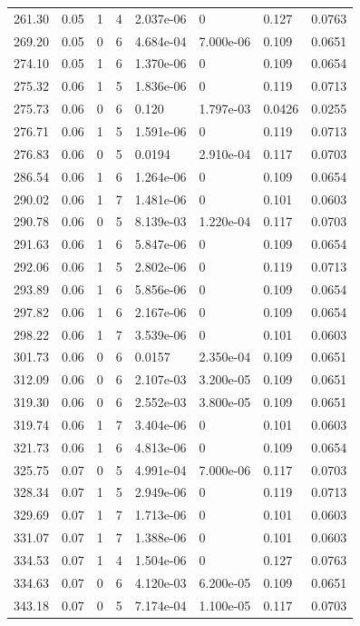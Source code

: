 \documentclass[preview]{standalone}
\begin{document}
{{{\begin{tabular}{L{1.2cm}C{1.2cm} C{0.3cm}C{0.5cm} C{1.4cm}C{1.4cm} C{1.4cm}C{1.4cm}}
  261.30  &  0.05  & 1     &  4 &  2.037e-06  & 0  & 0.127 &  0.0763   \\ 
  269.20  &  0.05  & 0     &  6 &  4.684e-04  & 7.000e-06  & 0.109 &  0.0651   \\ 
  274.10  &  0.05  & 1     &  6 &  1.370e-06  & 0  & 0.109 &  0.0654   \\ 
  275.32  &  0.06  & 1     &  5 &  1.836e-06  & 0  & 0.119 &  0.0713   \\ 
  275.73  &  0.06  & 0     &  6 &  0.120  & 1.797e-03  & 0.0426 &  0.0255   \\ 
  276.71  &  0.06  & 1     &  5 &  1.591e-06  & 0  & 0.119 &  0.0713   \\ 
  276.83  &  0.06  & 0     &  5 &  0.0194  & 2.910e-04  & 0.117 &  0.0703   \\ 
  286.54  &  0.06  & 1     &  6 &  1.264e-06  & 0  & 0.109 &  0.0654   \\ 
  290.02  &  0.06  & 1     &  7 &  1.481e-06  & 0  & 0.101 &  0.0603   \\ 
  290.78  &  0.06  & 0     &  5 &  8.139e-03  & 1.220e-04  & 0.117 &  0.0703   \\ 
  291.63  &  0.06  & 1     &  6 &  5.847e-06  & 0  & 0.109 &  0.0654   \\ 
  292.06  &  0.06  & 1     &  5 &  2.802e-06  & 0  & 0.119 &  0.0713   \\ 
  293.89  &  0.06  & 1     &  6 &  5.856e-06  & 0  & 0.109 &  0.0654   \\ 
  297.82  &  0.06  & 1     &  6 &  2.167e-06  & 0  & 0.109 &  0.0654   \\ 
  298.22  &  0.06  & 1     &  7 &  3.539e-06  & 0  & 0.101 &  0.0603   \\ 
  301.73  &  0.06  & 0     &  6 &  0.0157  & 2.350e-04  & 0.109 &  0.0651   \\ 
  312.09  &  0.06  & 0     &  6 &  2.107e-03  & 3.200e-05  & 0.109 &  0.0651   \\ 
  319.30  &  0.06  & 0     &  6 &  2.552e-03  & 3.800e-05  & 0.109 &  0.0651   \\ 
  319.74  &  0.06  & 1     &  7 &  3.404e-06  & 0  & 0.101 &  0.0603   \\ 
  321.73  &  0.06  & 1     &  6 &  4.813e-06  & 0  & 0.109 &  0.0654   \\ 
  325.75  &  0.07  & 0     &  5 &  4.991e-04  & 7.000e-06  & 0.117 &  0.0703   \\ 
  328.34  &  0.07  & 1     &  5 &  2.949e-06  & 0  & 0.119 &  0.0713   \\ 
  329.69  &  0.07  & 1     &  7 &  1.713e-06  & 0  & 0.101 &  0.0603   \\ 
  331.07  &  0.07  & 1     &  7 &  1.388e-06  & 0  & 0.101 &  0.0603   \\ 
  334.53  &  0.07  & 1     &  4 &  1.504e-06  & 0  & 0.127 &  0.0763   \\ 
  334.63  &  0.07  & 0     &  6 &  4.120e-03  & 6.200e-05  & 0.109 &  0.0651   \\ 
  343.18  &  0.07  & 0     &  5 &  7.174e-04  & 1.100e-05  & 0.117 &  0.0703   \\ 
\hline 
\end{tabular} 

}}}
\end{document}
